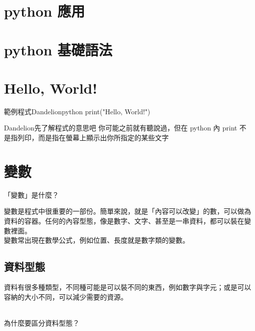 \documentclass{article}
\begin{document}
\begin{large}
\section{python 應用}




\section{python 基礎語法}
\section{Hello, World!}
    \begin{mintbox}{範例程式}{Dandelion}{python}
    print("Hello, World!")
    \end{mintbox}

    \begin{boxpar}{Dandelion}{先了解程式的意思吧}
        你可能之前就有聽說過，但在 python 內 print 不是指列印，而是指在螢幕上顯示出你所指定的某些文字
    \end{boxpar}




\section{變數}

    \begin{LARGE}
    「變數」是什麼？\\
    \end{LARGE}

    變數是程式中很重要的一部份。簡單來說，就是「內容可以改變」的數，可以做為資料的容器。任何的內容型態，像是數字、文字、甚至是一串資料，都可以裝在變數裡面。\\

    變數常出現在數學公式，例如位置、長度就是數字類的變數。\\



    \subsection{資料型態}

    資料有很多種類型，不同種可能是可以裝不同的東西，例如數字與字元；或是可以容納的大小不同，可以減少需要的資源。\\
    \\
    \begin{LARGE}
    為什麼要區分資料型態？\\
    \end{LARGE}
    \\


\end{large}
\end{document}
